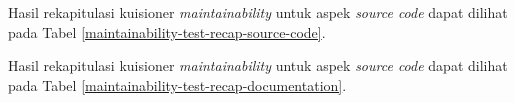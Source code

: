 Hasil rekapitulasi kuisioner \textit{maintainability} untuk aspek \textit{source code} dapat dilihat pada Tabel \ref{maintainability-test-recap-source-code}.

Hasil rekapitulasi kuisioner \textit{maintainability} untuk aspek \textit{source code} dapat dilihat pada Tabel \ref{maintainability-test-recap-documentation}.

